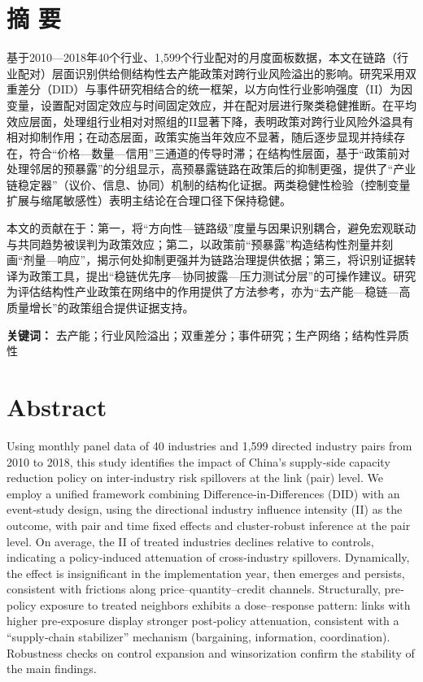 \chapter*{摘 要}
基于2010—2018年40个行业、1{,}599个行业配对的月度面板数据，本文在链路（行业配对）层面识别供给侧结构性去产能政策对跨行业风险溢出的影响。研究采用双重差分（DID）与事件研究相结合的统一框架，以方向性行业影响强度（II）为因变量，设置配对固定效应与时间固定效应，并在配对层进行聚类稳健推断。在平均效应层面，处理组行业相对对照组的II显著下降，表明政策对跨行业风险外溢具有相对抑制作用；在动态层面，政策实施当年效应不显著，随后逐步显现并持续存在，符合“价格—数量—信用”三通道的传导时滞；在结构性层面，基于“政策前对处理邻居的预暴露”的分组显示，高预暴露链路在政策后的抑制更强，提供了“产业链稳定器”（议价、信息、协同）机制的结构化证据。两类稳健性检验（控制变量扩展与缩尾敏感性）表明主结论在合理口径下保持稳健。

本文的贡献在于：第一，将“方向性—链路级”度量与因果识别耦合，避免宏观联动与共同趋势被误判为政策效应；第二，以政策前“预暴露”构造结构性剂量并刻画“剂量—响应”，揭示何处抑制更强并为链路治理提供依据；第三，将识别证据转译为政策工具，提出“稳链优先序—协同披露—压力测试分层”的可操作建议。研究为评估结构性产业政策在网络中的作用提供了方法参考，亦为“去产能—稳链—高质量增长”的政策组合提供证据支持。

\vspace{0.5em}
\noindent\textbf{关键词：} 去产能；行业风险溢出；双重差分；事件研究；生产网络；结构性异质性

\chapter*{Abstract}
Using monthly panel data of 40 industries and 1,599 directed industry pairs from 2010 to 2018, this study identifies the impact of China’s supply‐side capacity reduction policy on inter‐industry risk spillovers at the link (pair) level. We employ a unified framework combining Difference‐in‐Differences (DID) with an event‐study design, using the directional industry influence intensity (II) as the outcome, with pair and time fixed effects and cluster‐robust inference at the pair level. On average, the II of treated industries declines relative to controls, indicating a policy‐induced attenuation of cross‐industry spillovers. Dynamically, the effect is insignificant in the implementation year, then emerges and persists, consistent with frictions along price–quantity–credit channels. Structurally, pre‐policy exposure to treated neighbors exhibits a dose–response pattern: links with higher pre‐exposure display stronger post‐policy attenuation, consistent with a “supply‐chain stabilizer” mechanism (bargaining, information, coordination). Robustness checks on control expansion and winsorization confirm the stability of the main findings.

